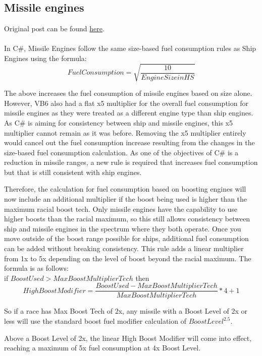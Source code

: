 \documentclass[../../Aurora C# unofficial manual.tex]{subfiles}
\begin{document}
	\subsection{Missile engines}
	Original post can be found
	\href{http://aurora2.pentarch.org/index.php?topic=8495.msg102804#msg102804}{here}.
	\\\\
	
	In C\#, Missile Engines follow the same size-based fuel consumption rules as Ship Engines using the formula:
	\[ Fuel Consumption = \sqrt{\frac{10}{Engine Size in HS}} \]
	
	The above increases the fuel consumption of missile engines based on size alone. However, VB6 also had a flat x5 multiplier for the overall fuel consumption for missile engines as they were treated as a different engine type than ship engines. As C\# is aiming for consistency between ship and missile engines, this x5 multiplier cannot remain as it was before. Removing the x5 multiplier entirely would cancel out the fuel consumption increase resulting from the changes in the size-based fuel consumption calculation. As one of the objectives of C\# is a reduction in missile ranges, a new rule is required that increases fuel consumption but that is still consistent with ship engines.
	
	Therefore, the calculation for fuel consumption based on boosting engines will now include an additional multiplier if the boost being used is higher than the maximum racial boost tech. Only missile engines have the capability to use higher boosts than the racial maximum, so this still allows consistency between ship and missile engines in the spectrum where they both operate. Once you move outside of the boost range possible for ships, additional fuel consumption can be added without breaking consistency. This rule adds a linear multiplier from 1x to 5x depending on the level of boost beyond the racial maximum. The formula is as follows:\\
	
	if \( Boost Used > Max Boost Multiplier Tech \) then
	\[ High Boost Modifier = \frac{Boost Used - Max Boost Multiplier Tech}{Max Boost Multiplier Tech} * 4 + 1 \]
	
	So if a race has Max Boost Tech of 2x, any missile with a Boost Level of 2x or less will use the standard boost fuel modifier calculation of \( Boost Level^{2.5} \).
	
	Above a Boost Level of 2x, the linear High Boost Modifier will come into effect, reaching a maximum of 5x fuel consumption at 4x Boost Level.
	
\end{document}

